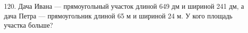 120. Дача Ивана --- прямоугольный участок длиной 649 дм и шириной 241 дм, а дача Петра --- прямоугольник длиной 65 м и шириной 24 м. У кого площадь участка больше?\\
